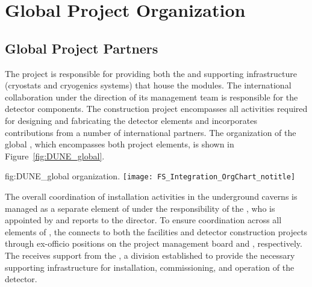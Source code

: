 \section{Global Project Organization}   %
\label{sec:exec-tc-partners}

\subsection{Global Project Partners}

The  project is responsible for providing both the
 and supporting infrastructure (cryostats and
cryogenics systems) that house the  
modules. 
The international 
collaboration under the direction of its management team is
responsible for the detector components.  The  
construction project encompasses all activities required for designing
and fabricating the detector elements and incorporates contributions
from a number of international partners.  The organization of the
global , which encompasses both project elements, is
shown in Figure~\ref{fig:DUNE_global}.

\begin{dunefigure}{fig:DUNE_global}
  { organization.}
  \texttt{[image: FS\_Integration\_OrgChart\_notitle]}
\end{dunefigure}

The overall
coordination of installation activities in the underground caverns 
is managed as a separate element of  under the
responsibility of the , who is appointed by and reports
to the  director.  To ensure coordination across
all elements of , the  connects to both
the facilities and detector construction projects through ex-officio
positions on the  project management board and
 , respectively.  The  receives support from the ,
a  division established to 
provide the necessary supporting infrastructure for installation, commissioning, and operation 
of the  detector. 

